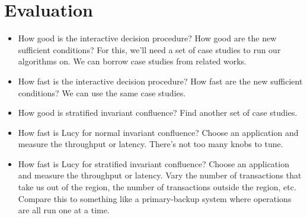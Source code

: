 \section{Evaluation}
\begin{itemize}
  \item
    How good is the interactive decision procedure? How good are the new
    sufficient conditions? For this, we'll need a set of case studies to run
    our algorithms on. We can borrow case studies from related works.
  \item
    How fast is the interactive decision procedure? How fast are the new
    sufficient conditions? We can use the same case studies.
  \item
    How good is stratified invariant confluence? Find another set of case
    studies.
  \item
    How fast is Lucy for normal invariant confluence? Choose an application and
    measure the throughput or latency. There's not too many knobs to tune.
  \item
    How fast is Lucy for stratified invariant confluence? Choose an application
    and measure the throughput or latency. Vary the number of transactions that
    take us out of the region, the number of transactions outside the region,
    etc. Compare this to something like a primary-backup system where
    operations are all run one at a time.
\end{itemize}

